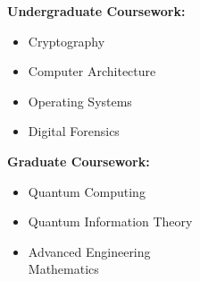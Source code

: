 
\begin{multicols}{2}
    \textbf{Undergraduate Coursework:}
    \begin{itemize}
        \item Cryptography
        \item Computer Architecture
        \item Operating Systems
        \item Digital Forensics
    \end{itemize} \vfill\null
    \columnbreak
    \textbf{Graduate Coursework:}
    \begin{itemize}
        \item Quantum Computing
        \item Quantum Information Theory
        \item Advanced Engineering \\Mathematics
    \end{itemize} \vfill\null
\end{multicols}